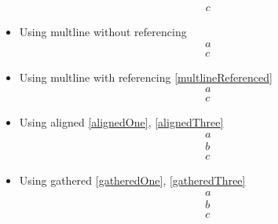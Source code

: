 \documentclass{article}
\begin{document}
\begin{itemize}
\begin{gather}
				c\label{gatherThree}
			\end{gather}
		\item Using multline without referencing
			\begin{multline}
				a\\
				c\label{multlineUnreferenced}
			\end{multline}
		\item Using multline with referencing \ref{multlineReferenced}
			\begin{multline}
				a\\
				c\label{multlineReferenced}
			\end{multline}
		\item Using aligned \ref{alignedOne}, \ref{alignedThree}
			\begin{equation}
				\begin{aligned}
					a\label{alignedOne}\\
					b\label{alignedTwo}\\
					c\label{alignedThree}
				\end{aligned}
			\end{equation}
		\item Using gathered \ref{gatheredOne}, \ref{gatheredThree}
			\begin{equation}
				\begin{gathered}
					a\label{gatheredOne}\\
					b\label{gatheredTwo}\\
					c\label{gatheredThree}
				\end{gathered}
			\end{equation}
	\end{itemize}
\end{document}
